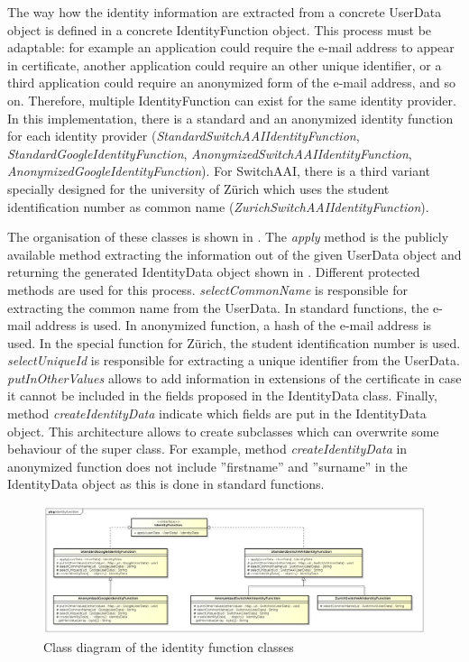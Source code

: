 \documentclass[oneside]{scrreprt}
\begin{document}
The way how the identity information are extracted from a concrete UserData object is defined in a concrete IdentityFunction object. This process must be adaptable: for example an application could require the e-mail address to appear in certificate, another application could require an other unique identifier, or a third application could require an anonymized form of the e-mail address, and so on. Therefore, multiple IdentityFunction can exist for the same identity provider. In this implementation, there is a standard and an anonymized identity function for each identity provider (\textit{StandardSwitchAAIIdentityFunction}, \textit{StandardGoogleIdentityFunction}, \textit{AnonymizedSwitchAAIIdentityFunction}, \textit{AnonymizedGoogleIdentityFunction}). For SwitchAAI, there is a third variant specially designed for the university of Zürich which uses the student identification number as common name (\textit{ZurichSwitchAAIIdentityFunction}).

The organisation of these classes is shown in . The \textit{apply} method is the publicly available method extracting the information out of the given UserData object and returning the generated IdentityData object shown in . Different protected methods are used for this process. \textit{selectCommonName} is responsible for extracting the common name from the UserData. In standard functions, the e-mail address is used. In anonymized function, a hash of the e-mail address is used. In the special function for Zürich, the student identification number is used. \textit{selectUniqueId} is responsible for extracting a unique identifier from the UserData. \textit{putInOtherValues} allows to add information in extensions of the certificate in case it cannot be included in the fields proposed in the IdentityData class. Finally, method \textit{createIdentityData} indicate which fields are put in the IdentityData object. This architecture allows to create subclasses which can overwrite some behaviour of the super class. For example, method \textit{createIdentityData} in anonymized function does not include ''firstname'' and ''surname'' in the IdentityData object as this is done in standard functions.

\begin{figure}[ht]
\centerline{
\includegraphics[width=\textwidth]{figs/identity_function_class_diagram.png}}
\caption{Class diagram of the identity function classes}
\label{fig:identity_function_class_diagram}
\end{figure}
\end{document}
